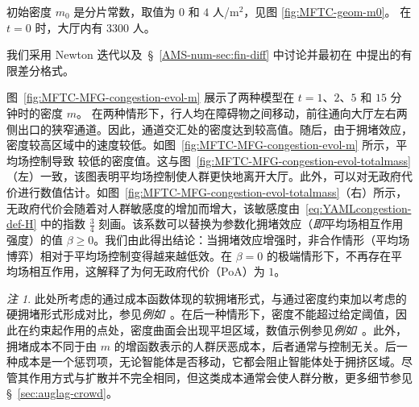 \documentclass{amsproc}
\theoremstyle{definition}
\theoremstyle{remark}
\newtheorem{remark}[theorem]{注}
\numberwithin{equation}{section}
\begin{document}
初始密度 $m_0$ 是分片常数，取值为 $0$ 和 $4$ 人/m$^2$，见图 \ref{fig:MFTC-geom-m0}。
在 $t=0$ 时，大厅内有 3300 人。%

我们采用 Newton 迭代以及~\S~\ref{AMS-num-sec:fin-diff} 中讨论并最初在 \cite{MR2679575} 中提出的有限差分格式。



图~\ref{fig:MFTC-MFG-congestion-evol-m} 展示了两种模型在 $t=1$、$2$、$5$ 和 $15$ 分钟时的密度 $m$。
在两种情形下，行人均在障碍物之间移动，前往通向大厅左右两侧出口的狭窄通道。因此，通道交汇处的密度达到较高值。随后，由于拥堵效应，密度较高区域中的速度较低。如图~\ref{fig:MFTC-MFG-congestion-evol-m} 所示，平均场控制导致
较低的密度值。这与图~\ref{fig:MFTC-MFG-congestion-evol-totalmass}（左）一致，该图表明平均场控制使人群更快地离开大厅。此外，可以对无政府代价进行数值估计。如图~\ref{fig:MFTC-MFG-congestion-evol-totalmass}（右）所示，无政府代价会随着对人群敏感度的增加而增大，该敏感度由~\eqref{eq:YAMLcongestion-def-H} 中的指数 $\frac{3}{4}$ 刻画。该系数可以替换为参数化拥堵效应（\textit{即}平均场相互作用强度）的值 $\beta\ge0$。我们由此得出结论：当拥堵效应增强时，非合作情形（平均场博弈）相对于平均场控制变得越来越低效。在 $\beta=0$ 的极端情形下，不再存在平均场相互作用，这解释了为何无政府代价（PoA）为 $1$。
 

 \begin{remark}
 \label{rem:congestion}
 	此处所考虑的通过成本函数体现的软拥堵形式，与通过密度约束加以考虑的硬拥堵形式形成对比，参见\textit{例如}~\cite{MR3420414,MR3556062}。在后一种情形下，密度不能超过给定阈值，因此在约束起作用的点处，密度曲面会出现平坦区域，数值示例参见\textit{例如}~\cite{MR3772008}。此外，拥堵成本不同于由 $m$ 的增函数表示的人群厌恶成本，后者通常与控制无关。后一种成本是一个惩罚项，无论智能体是否移动，它都会阻止智能体处于拥挤区域。尽管其作用方式与扩散并不完全相同，但这类成本通常会使人群分散，更多细节参见 \S~\ref{sec:auglag-crowd}。
 \end{remark}
\end{document}
